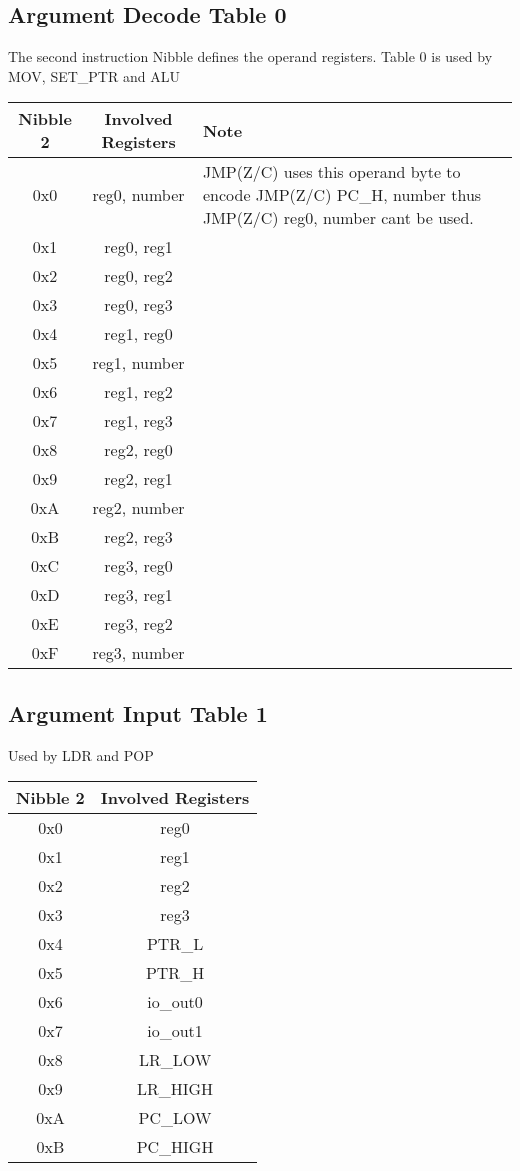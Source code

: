 \documentclass[a4paper, 12pt]{article}
\begin{document}
	\subsection{Argument Decode Table 0}
	The second instruction Nibble defines the operand registers.
	Table 0 is used by MOV, SET\_PTR and ALU
	\begin{center}
		\begin{tabular}{|c|c|p{6cm}|}
			\hline
			Nibble 2 & Involved Registers & Note \\ \hline
			0x0 & reg0, number & JMP(Z/C) uses this operand byte to encode JMP(Z/C) PC\_H, number thus JMP(Z/C) reg0, number cant be used. \\ \hline
			0x1 & reg0, reg1 & \\ \hline
			0x2 & reg0, reg2 & \\ \hline
			0x3 & reg0, reg3 & \\ \hline
			0x4 & reg1, reg0 & \\ \hline
			0x5 & reg1, number & \\ \hline
			0x6 & reg1, reg2 & \\ \hline
			0x7 & reg1, reg3 & \\ \hline
			0x8 & reg2, reg0 & \\ \hline
			0x9 & reg2, reg1 & \\ \hline
			0xA & reg2, number & \\ \hline
			0xB & reg2, reg3 & \\ \hline
			0xC & reg3, reg0 & \\ \hline
			0xD & reg3, reg1 & \\ \hline
			0xE & reg3, reg2 & \\ \hline
			0xF & reg3, number & \\ \hline
		\end{tabular}
	\end{center}	
	\newpage
	\subsection{Argument Input Table 1}
	Used by LDR and POP
	\begin{center}
		\begin{tabular}{|c|c|}
			\hline
			Nibble 2 & Involved Registers \\ \hline
			0x0 & reg0 \\ \hline
			0x1 & reg1 \\ \hline
			0x2 & reg2 \\ \hline
			0x3 & reg3 \\ \hline
			0x4 & PTR\_L\\ \hline
			0x5 & PTR\_H \\ \hline
			0x6 & io\_out0 \\ \hline
			0x7 & io\_out1 \\ \hline
			0x8 & LR\_LOW \\ \hline
			0x9 & LR\_HIGH \\ \hline
			0xA & PC\_LOW \\ \hline
			0xB & PC\_HIGH \\ \hline
		\end{tabular}
	\end{center}	
\end{document}
